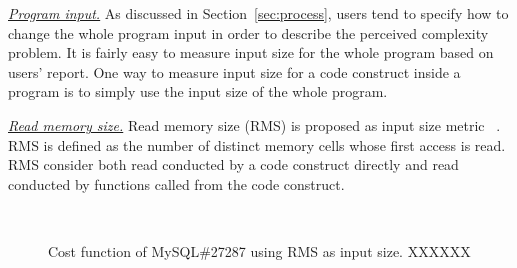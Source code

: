 \underline{\textit{Program input.}}
As discussed in Section~\ref{sec:process}, 
users tend to specify how to change the whole program 
input in order to describe the perceived complexity problem.
It is fairly easy to measure input size for the whole program based on users' report.
One way to measure input size for a code construct inside a program
is to simply use the input size of the whole program. 

\underline{\textit{Read memory size.}}
Read memory size (RMS) is proposed as input size metric~\cite{Aprof1,Aprof2} . 
RMS is defined as the number of distinct memory cells 
whose first access is read. 
RMS consider both read conducted by a code construct directly 
and read conducted by 
functions called from the code construct. 

\begin{figure}
\centering
{}
 \\ 
\vspace{-0.1in}
\caption{Cost function of MySQL\#27287 using RMS as input size. XXXXXX} 
\label{fig:mysql27287-2} 
\end{figure} 

